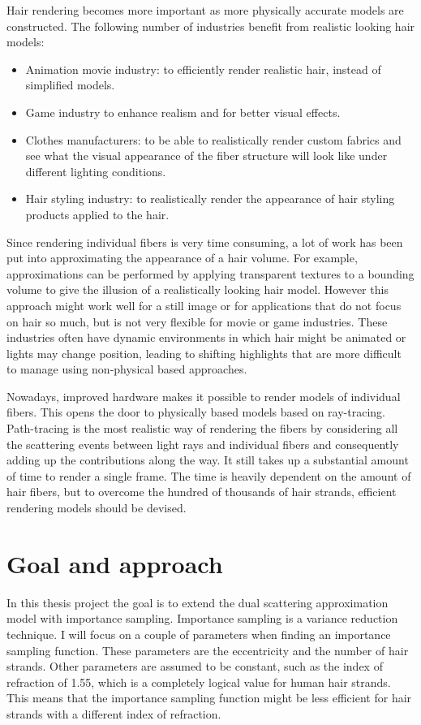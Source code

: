 \documentclass[11pt,a4paper]{report}
\begin{document}
Hair rendering becomes more important as more physically accurate models are constructed. The following number of industries benefit from realistic looking hair models:

\begin{itemize}
\item Animation movie industry: to efficiently render realistic hair, instead of simplified models.
\item Game industry to enhance realism and for better visual effects.
\item Clothes manufacturers: to be able to realistically render custom fabrics and see what the visual appearance of the fiber structure will look like under different lighting conditions.
\item Hair styling industry: to realistically render the appearance of hair styling products applied to the hair.
\end{itemize}

Since rendering individual fibers is very time consuming, a lot of work has been put into approximating the appearance of a hair volume. For example, approximations can be performed by applying transparent textures to a bounding volume to give the illusion of a realistically looking hair model. However this approach might work well for a still image or for applications that do not focus on hair so much, but is not very flexible for movie or game industries. These industries often have dynamic environments in which hair might be animated or lights may change position, leading to shifting highlights that are more difficult to manage using non-physical based approaches.

Nowadays, improved hardware makes it possible to render models of individual fibers. This opens the door to physically based models based on ray-tracing. Path-tracing is the most realistic way of rendering the fibers by considering all the scattering events between light rays and individual fibers and consequently adding up the contributions along the way. It still takes up a substantial amount of time to render a single frame. The time is heavily dependent on the amount of hair fibers, but to overcome the hundred of thousands of hair strands, efficient rendering models should be devised.


\section{Goal and approach}
In this thesis project the goal is to extend the dual scattering approximation model with importance sampling. Importance sampling is a variance reduction technique. I will focus on a couple of parameters when finding an importance sampling function. These parameters are the eccentricity and the number of hair strands. Other parameters are assumed to be constant, such as the index of refraction of 1.55, which is a completely logical value for human hair strands. This means that the importance sampling function might be less efficient for hair strands with a different index of refraction.
\end{document}
